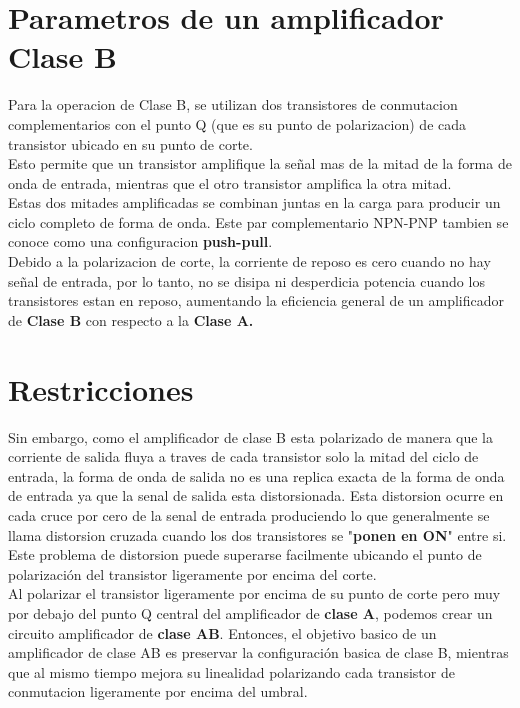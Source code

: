 \documentclass[11pt,a4paper]{article}
\begin{document}
\part{Parametros de un amplificador Clase B}

Para la operacion de Clase B, se utilizan dos transistores de conmutacion complementarios con el punto Q (que es su punto de polarizacion) de cada transistor ubicado en su punto de corte.\\
Esto permite que un transistor amplifique la señal mas de la mitad de la forma de onda de entrada, mientras que el otro transistor amplifica la otra mitad.\\
Estas dos mitades amplificadas se combinan juntas en la carga para producir un ciclo completo de forma de onda. Este par complementario NPN-PNP tambien se conoce como una configuracion \textbf{push-pull}.\\
Debido a la polarizacion de corte, la corriente de reposo es cero cuando no hay señal de entrada, por lo tanto, no se disipa ni desperdicia potencia cuando los transistores estan en reposo, aumentando la eficiencia general de un amplificador de \textbf{Clase B} con respecto a la \textbf{Clase A.}

\part{Restricciones}

Sin embargo, como el amplificador de clase B esta polarizado de manera que la corriente de salida fluya a traves de cada transistor solo la mitad del ciclo de entrada, la forma de onda de salida no es una replica exacta de la forma de onda de entrada ya que la senal de salida esta distorsionada. Esta distorsion ocurre en cada cruce por cero de la senal de entrada produciendo lo que generalmente se llama distorsion cruzada cuando los dos transistores se "\textbf{ponen en ON}" entre si.\\
Este problema de distorsion puede superarse facilmente ubicando el punto de polarización del transistor ligeramente por encima del corte.\\
Al polarizar el transistor ligeramente por encima de su punto de corte pero muy por debajo del punto Q central del amplificador de \textbf{clase A}, podemos crear un circuito amplificador de \textbf{clase AB}. Entonces, el objetivo basico de un amplificador de clase AB es preservar la configuración basica de clase B, mientras que al mismo tiempo mejora su linealidad polarizando cada transistor de conmutacion ligeramente por encima del umbral.
\end{document}
